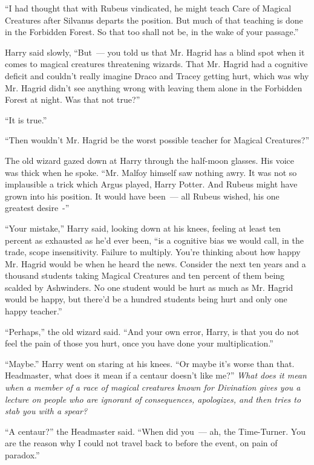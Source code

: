 ``I had thought that with Rubeus vindicated, he might teach Care of Magical Creatures after Silvanus departs the position. But much of that teaching is done in the Forbidden Forest. So that too shall not be, in the wake of your passage.''

Harry said slowly, ``But~--- you told us that Mr. Hagrid has a blind spot when it comes to magical creatures threatening wizards. That Mr. Hagrid had a cognitive deficit and couldn't really imagine Draco and Tracey getting hurt, which was why Mr. Hagrid didn't see anything wrong with leaving them alone in the Forbidden Forest at night. Was that not true?''

``It is true.''

``Then wouldn't Mr. Hagrid be the worst possible teacher for Magical Creatures?''

The old wizard gazed down at Harry through the half-moon glasses. His voice was thick when he spoke. ``Mr. Malfoy himself saw nothing awry. It was not so implausible a trick which Argus played, Harry Potter. And Rubeus might have grown into his position. It would have been~--- all Rubeus wished, his one greatest desire~-''

``Your mistake,'' Harry said, looking down at his knees, feeling at least ten percent as exhausted as he'd ever been, ``is a cognitive bias we would call, in the trade, scope insensitivity. Failure to multiply. You're thinking about how happy Mr. Hagrid would be when he heard the news. Consider the next ten years and a thousand students taking Magical Creatures and ten percent of them being scalded by Ashwinders. No one student would be hurt as much as Mr. Hagrid would be happy, but there'd be a hundred students being hurt and only one happy teacher.''

``Perhaps,'' the old wizard said. ``And your own error, Harry, is that you do not feel the pain of those you hurt, once you have done your multiplication.''

``Maybe.'' Harry went on staring at his knees. ``Or maybe it's worse than that. Headmaster, what does it mean if a centaur doesn't like me?'' \emph{What does it mean when a member of a race of magical creatures known for Divination gives you a lecture on people who are ignorant of consequences, apologizes, and then tries to stab you with a spear?}

``A centaur?'' the Headmaster said. ``When did you~--- ah, the Time-Turner. You are the reason why I could not travel back to before the event, on pain of paradox.''


